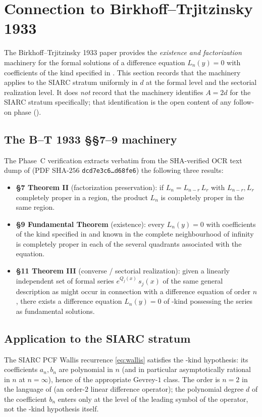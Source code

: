 \documentclass[11pt,reqno]{amsart}
\theoremstyle{plain}
\theoremstyle{definition}
\theoremstyle{remark}
\begin{document}
\section{Connection to Birkhoff--Trjitzinsky 1933}
\label{sec:bt}

The Birkhoff--Trjitzinsky 1933 paper
\cite{birkhoff_trjitzinsky_1933} provides the
\emph{existence and factorization} machinery for the formal
solutions of a difference equation $L_n(y) = 0$ with
coefficients of the kind specified in \cite[\S1]{birkhoff_trjitzinsky_1933}.
This section records that the machinery applies to the SIARC
stratum uniformly in $d$ at the formal level and the sectorial
realization level. It does \emph{not} record that the machinery
identifies $A = 2d$ for the SIARC stratum specifically; that
identification is the open content of any follow-on phase
().

\subsection{The B--T 1933 \S\S7--9 machinery}
The Phase~C verification \cite[Phase~C]{siarc_t1_phase2}
extracts verbatim from the SHA-verified OCR text dump of
\cite{birkhoff_trjitzinsky_1933} (PDF SHA-$256$
\texttt{dcd7e3c6\dots d68fe6}) the following three results:

\begin{itemize}[leftmargin=2.2em]
\item \textbf{\S7 Theorem II} (factorization preservation):
  if $L_n = L_{n-r}\,L_r$ with $L_{n-r}, L_r$ completely proper
  in a region, the product $L_n$ is completely proper in the
  same region.
\item \textbf{\S9 Fundamental Theorem} (existence):
  every $L_n(y) = 0$ with coefficients of the kind specified
  in \cite[\S1]{birkhoff_trjitzinsky_1933} and known in the
  complete neighbourhood of infinity is completely proper in
  each of the several quadrants associated with the equation.
\item \textbf{\S11 Theorem III} (converse / sectorial
  realization): given a linearly independent set of formal
  series $e^{Q_j(x)}\,s_j(x)$ of the same general description
  as might occur in connection with a difference equation of
  order $n$, there exists a difference equation $L_n(y) = 0$
  of \cite[\S1]{birkhoff_trjitzinsky_1933}-kind possessing the
  series as fundamental solutions.
\end{itemize}

\subsection{Application to the SIARC stratum}
The SIARC PCF Wallis recurrence \eqref{eq:wallis} satisfies
the \cite[\S1]{birkhoff_trjitzinsky_1933}-kind hypothesis: its
coefficients $a_n, b_n$ are polynomial in $n$ (and in
particular asymptotically rational in $n$ at $n = \infty$),
hence of the appropriate Gevrey-$1$ class. The order is
$n = 2$ in the language of \cite{birkhoff_trjitzinsky_1933}
(an order-$2$ linear difference operator); the polynomial
degree $d$ of the coefficient $b_n$ enters only at the level
of the leading symbol of the operator, not the
\cite[\S1]{birkhoff_trjitzinsky_1933}-kind hypothesis itself.
\end{document}
